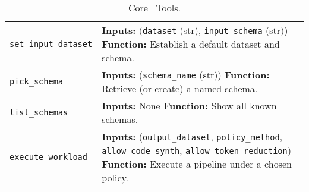 \begin{table}[t]
\begin{tabular}{p{2.0cm}p{5.1cm}}
\texttt{set\_input\_dataset}
& \textbf{Inputs:} (\texttt{dataset} (str), \texttt{input\_schema} (str))
\newline \textbf{Function:} Establish a default dataset and schema. \\[5pt]

\texttt{pick\_schema}
& \textbf{Inputs:} (\texttt{schema\_name} (str))
\newline \textbf{Function:} Retrieve (or create) a named schema. \\[5pt]

\texttt{list\_schemas}
& \textbf{Inputs:} None
\newline \textbf{Function:} Show all known schemas. \\[5pt]

\texttt{execute\_workload}
& \textbf{Inputs:} (\texttt{output\_dataset}, \texttt{policy\_method}, \texttt{allow\_code\_synth}, \texttt{allow\_token\_reduction})
\newline \textbf{Function:} Execute a pipeline under a chosen policy. \\
\bottomrule
\end{tabular}
\caption{Core \chat\ Tools.}
\end{table}
